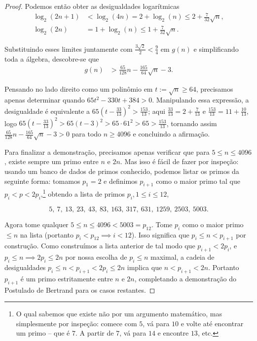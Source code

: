 \documentclass[11pt]{article}
\theoremstyle{remark}
\newcommand{\vs}{\vspace{10px}}
\begin{document}
\begin{proof}
    Podemos então obter as desigualdades logarítmicas
    \begin{align*}
    \log_2(2n+1) &< \log_2(4n) = 2 + \log_2(n) \le 2 + \frac{7}{32}\sqrt{n}, \\
    \log_2(2n) &= 1 + \log_2(n) \le 1 + \frac{7}{32}\sqrt{n}.
    \end{align*}
    
    Substituindo esses limites juntamente com $\frac{3\sqrt{2}}{2} < \frac{9}{4}$ em $g(n)$ e simplificando toda a álgebra, descobre-se que
    \begin{align*}
    g(n) &> \frac{65}{128}n - \frac{165}{64}\sqrt{n} - 3.
    \end{align*}

    Pensando no lado direito como um polinômio em $t:= \sqrt{n}\ge 64$, precisamos apenas determinar quando $65t^2-330t+384>0$. Manipulando essa expressão, a desigualdade é equivalente a $65\left(t-\frac{33}{13}\right)^2>\frac{153}{13}$; aqui $\frac{33}{13}=2+\frac{7}{13}$ e $\frac{153}{13}=11+\frac{10}{13}$, logo $65(t-\frac{33}{13})^2>65(t-3)^2>65\cdot 61^2>65>\frac{153}{13}$, tornando assim $\frac{65}{128}n - \frac{165}{64}\sqrt{n} - 3>0$ para todo $n\ge 4096$ e concluindo a afirmação.
    \vs

    Para finalizar a demonstração, precisamos apenas verificar que para $5\le n\le 4096$, existe sempre um primo entre $n$ e $2n$. Mas isso é fácil de fazer por inspeção: usando um banco de dados de primos conhecido, podemos listar os primos da seguinte forma: tomamos $p_1=2$ e definimos $p_{i+1}$ como o maior primo tal que $p_i<p< 2p_i$,\footnote{O qual sabemos que existe não por um argumento matemático, mas simplesmente por inspeção: comece com $5$, vá para $10$ e volte até encontrar um primo -- que é $7$. A partir de $7$, vá para $14$ e encontre $13$, etc.} obtendo a lista de primos $p_i, 1\le i\le 12$,

    $$
    5,\ 7,\ 13,\ 23,\ 43,\ 83,\ 163,\ 317,\ 631,\ 1259,\ 2503,\ 5003.
    $$

    Agora tome qualquer $5\le n\le 4096<5003=p_{12}$. Tome $p_i$ como o maior primo $\le n$ na lista (portanto $p_i<p_{12}\implies i<12$). Isso significa que $p_i\le n<p_{i+1}$ por construção. Como construímos a lista anterior de tal modo que $p_{i+1}<2p_i$, e $p_i\le n\implies 2p_i\le 2n$ por nossa escolha de $p_i\le n$ maximal, a cadeia de desigualdades $p_i\le n<p_{i+1}<2p_i\le 2n$ implica que $n<p_{i+1}<2n$. Portanto $p_{i+1}$ é um primo estritamente entre $n$ e $2n$, completando a demonstração do Postulado de Bertrand para os casos restantes.
\end{proof}




\end{document}

